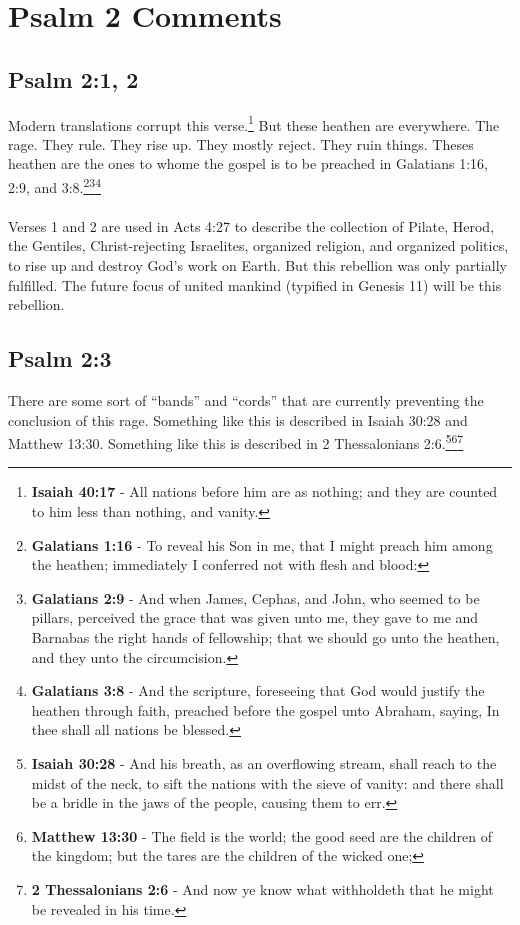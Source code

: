 \section{Psalm 2 Comments}



\subsection{Psalm 2:1, 2}
Modern translations corrupt this verse.\footnote{\textbf{Isaiah 40:17} - All nations before him are as nothing; and they are counted to him less than nothing, and vanity.} But these heathen are everywhere.  The rage. They rule.  They rise up. They mostly reject. They ruin things.  Theses heathen are the ones to whome the gospel is to be preached in Galatians 1:16, 2:9, and 3:8.\footnote{\textbf{Galatians 1:16} - To reveal his Son in me, that I might preach him among the heathen; immediately I conferred not with flesh and blood:}\footnote{\textbf{Galatians 2:9} - And when James, Cephas, and John, who seemed to be pillars, perceived the grace that was given unto me, they gave to me and Barnabas the right hands of fellowship; that we should go unto the heathen, and they unto the circumcision.}\footnote{\textbf{Galatians 3:8} - And the scripture, foreseeing that God would justify the heathen through faith, preached before the gospel unto Abraham, saying, In thee shall all nations be blessed.}\\
\\
\noindent Verses 1 and 2 are used in Acts 4:27 to describe the collection of Pilate, Herod, the Gentiles, Christ-rejecting Israelites, organized religion, and organized politics, to rise up and destroy God's work on Earth.  But this rebellion was only partially fulfilled.\cite{Ruckman1992PsalmsV1} The future focus of united mankind (typified in Genesis 11) will be this rebellion.




\subsection{Psalm 2:3}
There are some sort of ``bands'' and ``cords'' that are currently preventing the conclusion of this rage. Something like this is described in Isaiah 30:28 and Matthew 13:30. Something like this is described in 2 Thessalonians 2:6.\footnote{\textbf{Isaiah 30:28} - And his breath, as an overflowing stream, shall reach to the midst of the neck, to sift the nations with the sieve of vanity: and there shall be a bridle in the jaws of the people, causing them to err.}\footnote{\textbf{Matthew 13:30} - The field is the world; the good seed are the children of the kingdom; but the tares are the children of the wicked one;}\footnote{\textbf{2 Thessalonians 2:6} - And now ye know what withholdeth that he might be revealed in his time.} \cite{Ruckman1992PsalmsV1}
